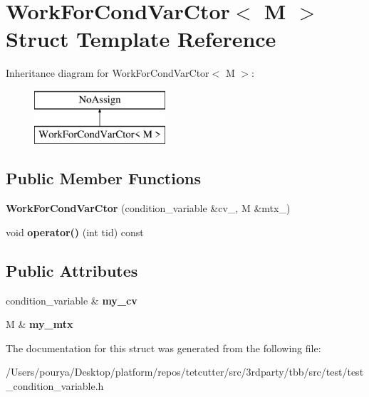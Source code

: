 \hypertarget{structWorkForCondVarCtor}{}\section{Work\+For\+Cond\+Var\+Ctor$<$ M $>$ Struct Template Reference}
\label{structWorkForCondVarCtor}
Inheritance diagram for Work\+For\+Cond\+Var\+Ctor$<$ M $>$\+:\begin{figure}[H]
\begin{center}
\leavevmode
\includegraphics[height=2.000000cm]{structWorkForCondVarCtor}
\end{center}
\end{figure}
\subsection*{Public Member Functions}
\begin{DoxyCompactItemize}
\item 
\hypertarget{structWorkForCondVarCtor_aeb866ca34ac208ce6ca65b8473929f53}{}{\bfseries Work\+For\+Cond\+Var\+Ctor} (condition\+\_\+variable \&cv\+\_\+, M \&mtx\+\_\+)\label{structWorkForCondVarCtor_aeb866ca34ac208ce6ca65b8473929f53}

\item 
\hypertarget{structWorkForCondVarCtor_a6cc621df4e572e97094f577757954e47}{}void {\bfseries operator()} (int tid) const \label{structWorkForCondVarCtor_a6cc621df4e572e97094f577757954e47}

\end{DoxyCompactItemize}
\subsection*{Public Attributes}
\begin{DoxyCompactItemize}
\item 
\hypertarget{structWorkForCondVarCtor_a807396bb568bba07d1687cd4cb035203}{}condition\+\_\+variable \& {\bfseries my\+\_\+cv}\label{structWorkForCondVarCtor_a807396bb568bba07d1687cd4cb035203}

\item 
\hypertarget{structWorkForCondVarCtor_a1c08f9842edbceb17360d57761162310}{}M \& {\bfseries my\+\_\+mtx}\label{structWorkForCondVarCtor_a1c08f9842edbceb17360d57761162310}

\end{DoxyCompactItemize}


The documentation for this struct was generated from the following file\+:\begin{DoxyCompactItemize}
\item 
/\+Users/pourya/\+Desktop/platform/repos/tetcutter/src/3rdparty/tbb/src/test/test\+\_\+condition\+\_\+variable.\+h\end{DoxyCompactItemize}
